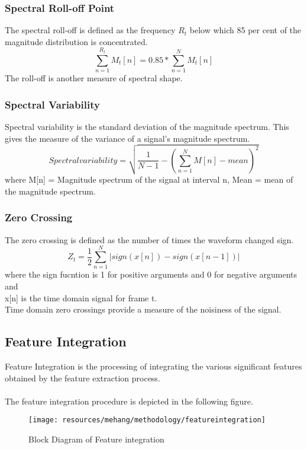 \subsubsection{Spectral Roll-off Point}
The spectral roll-off is defined as the frequency $R_t$ below which 85 per cent of the magnitude distribution is concentrated.
\begin{equation}
        \sum_{n=1}^{R_t}M_t[n] = 0.85*\sum_{n=1}^{N}{M_t[n]}
\end{equation}
The roll-off is another measure of spectral shape.

\subsubsection{Spectral Variability}
  Spectral variability is the standard deviation of the magnitude spectrum. This gives the 
  measure of the variance of a signal's magnitude spectrum. 
  \begin{equation}
          Spectral variability = \sqrt{\frac{1}{N-1}-(\sum_{n=1}^{N}{M[n]-mean})^2}
  \end{equation}
  where M[n] = Magnitude spectrum of the signal at interval n,
  Mean = mean of the magnitude spectrum.

\subsubsection{Zero Crossing}
The zero crossing is defined as the number of times the waveform changed sign.
\begin{equation}
        Z_t = \frac{1}{2}\sum_{n=1}^{N}{|sign(x[n])-sign(x[n-1])|}
\end{equation}
where the sign fucntion is 1 for positive arguments and 0 for negative arguments and\\
x[n] is the time domain signal for frame t.\\
Time domain zero crossings provide a measure of the noisiness of the signal.

\subsection{Feature Integration}
Feature Integration is the processing of integrating the various significant features obtained by the feature extraction process.\\
\\
The feature integration procedure is depicted in the following figure.
\begin{figure}[h!]
        \centering
        \texttt{[image: resources/mehang/methodology/featureintegration]}
        \caption{Block Diagram of Feature integration}
\end{figure}

